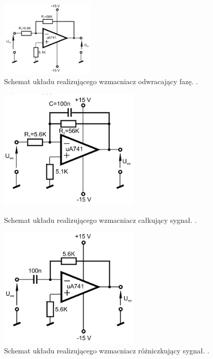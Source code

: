 \documentclass[11pt,a4paper]{article}
\begin{document}
\begin{figure}[ht!]	
	\begin{center}
		\includegraphics[width = 0.4\textwidth]{schemat_odwracajacy.png}
		\caption{Schemat układu realizującego wzmacniacz odwracający fazę. \cite{instrukcja}.}
		\label{wzm_odwracajacy}
	\end{center}
\end{figure}	

\begin{figure}[htp!]
\begin{minipage}{0.5\linewidth}

	\begin{center}
		\includegraphics[width = 0.6\textwidth]{schemat_calkujacy.png}
		\caption{Schemat układu realizującego wzmacniacz całkujący sygnał. \cite{instrukcja}.}
		\label{wzm_calkujacy}
	\end{center}
\end{minipage}
\begin{minipage}{0.5\linewidth}
	\begin{center}
		\includegraphics[width = 0.6\textwidth]{schemat_rozniczkujacy.png}
		\caption{Schemat układu realizującego wzmacniacz różniczkujący sygnał. \cite{instrukcja}.}
		\label{wzm_rozniczkujacy}
	\end{center}
\end{minipage}
\end{figure}
\end{document}
